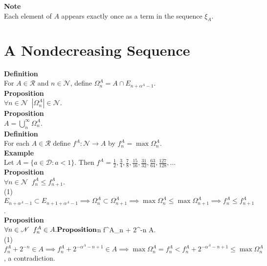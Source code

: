\documentclass{article}
\newcommand{\targetset}{ \mathscr{R}}
\newcommand{\sourceset}{ \mathscr{D}}
\newcommand{\nondisjoints}{E}
\newcommand{\naturals}{ \mathscr{N}}
\newcommand{\carpenter}{ \xi }
\newcommand{\climber}{ f}
\newcommand{\elt}{a}
\newcommand{\interceptor}{\Omega}
\newcommand{\wed}{\alpha}
\begin{document}
\textbf{Note}\\
Each element of $A$ appears exactly once as a term in the sequence $\carpenter_A$.\\


\section{A Nondecreasing Sequence}


\textbf{Definition}\\
For $A \in \targetset$ and $ n \in \naturals$, define $\interceptor ^A_n = A \cap \nondisjoints_{n + \wed^A - 1}$.\\

\textbf{Proposition}\\
$\forall n \in \naturals \;\; |\interceptor^A_n| \in \naturals$.\\

\textbf{Proposition}\\
$A = \bigcup_n^\infty \interceptor^A_n$.\\


\textbf{Definition}\\
For each $A \in \targetset$ define $\climber^A: \naturals \to A$ by $\climber^A_n = \max \interceptor^A_n$.\\

\textbf{Example}\\
Let $A = \{ \elt \in \sourceset :\elt < 1 \}.$ Then  $\climber^A = \frac{1}{2}, \frac{3}{4},\frac{7}{8},\frac{15}{16},\frac{31}{32},\frac{63}{64},\frac{127}{128}, ... $\\

\textbf{Proposition}\\
$\forall n \in \naturals  \;\;f^A_n \le f^A_{n + 1}$.\\

(1) $\nondisjoints_{n+ \wed^A - 1} \subset \nondisjoints_{n+1 + \wed^A - 1} \implies \interceptor^A_n \subset \interceptor^A_{n+1} \implies  \max \interceptor^A_n \le \max \interceptor^A_{n+1} \implies f^A_n \le f^A_{n + 1}$.\\

 \textbf{Proposition}\\
 $\forall n \in \naturals \;\; f^A_n \in A.\\

\textbf{Proposition}\\
$\forall n \in \naturals \;\; f^A_n + 2^{-n} \notin A.\\

(1)$f^A_n +2^{-n} \in A \implies f^A_n + 2^{-\alpha^A - n + 1} \in A \implies \max \interceptor^A_n = f^A_n < f^A_n + 2^{-\alpha^A - n + 1} \le \max \interceptor^A_n$, a contradiction.\\
\end{document}
